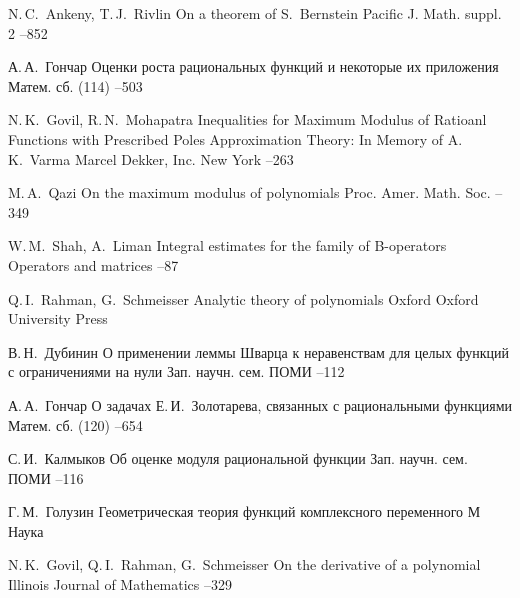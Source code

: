 \documentclass[a4paper,12pt,twoside]{article}
\begin{document}
 \begin{thebibliography}{12}
 \setlength{\parsep}{0pt}\setlength{\itemsep}{3pt}

\by N.\,C.~Ankeny, T.\,J.~Rivlin
\paper On a theorem of S.~Bernstein
\jour Pacific J. Math.
\issue suppl. 2
--852

\by А.\,А.~Гончар
\paper Оценки роста рациональных функций и некоторые их приложения
\jour Матем. сб.
(114)
--503

\by N.\,K.~Govil, R.\,N.~Mohapatra
\paper Inequalities for Maximum Modulus of Ratioanl Functions with Prescribed Poles
\inbook Approximation Theory: In Memory of A.\,K.~Varma
\publ Marcel Dekker, Inc.
\publaddr New York
--263

\by M.\,A.~Qazi
\paper On the maximum modulus of polynomials
\jour Proc. Amer. Math. Soc.
 
--349

\by W.\,M.~Shah, A.~Liman
\paper Integral estimates for the family of B-operators
\jour Operators and matrices
--87

\by Q.\,I.~Rahman,  G.~Schmeisser
\book Analytic theory of polynomials
\publaddr Oxford
\publ Oxford University Press

\by В.\,Н.~Дубинин
\paper О применении леммы Шварца к неравенствам для целых функций с ограничениями на нули
\jour Зап. научн. сем. ПОМИ
--112

\by А.\,А.~Гончар
\paper О задачах Е.\,И.~Золотарева, связанных с рациональными функциями
\jour Матем. сб.
(120)
--654

\by С.\,И.~Калмыков
\paper Об оценке модуля рациональной функции
\jour Зап. научн. сем. ПОМИ
--116

\by Г.\,М.~Голузин
\book Геометрическая теория функций комплексного переменного
\publaddr М
\publ Наука

\by N.\,K.~Govil, Q.\,I.~Rahman, G.~Schmeisser
\paper On the derivative of a polynomial
\jour Illinois Journal of Mathematics
--329

\end{thebibliography}

\EndArticle
\end{document}
